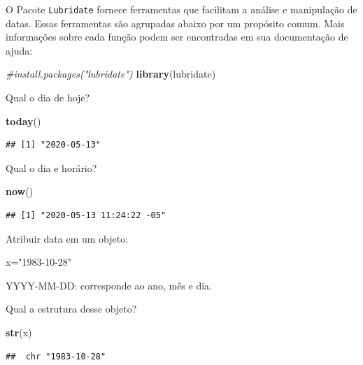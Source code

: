 \documentclass[
]{book}
\newenvironment{Shaded}{\begin{snugshade}}{\end{snugshade}}
\newcommand{\CommentTok}[1]{\textcolor[rgb]{0.56,0.35,0.01}{\textit{#1}}}
\newcommand{\KeywordTok}[1]{\textcolor[rgb]{0.13,0.29,0.53}{\textbf{#1}}}
\newcommand{\NormalTok}[1]{#1}
\newcommand{\StringTok}[1]{\textcolor[rgb]{0.31,0.60,0.02}{#1}}
\begin{document}
O Pacote \texttt{Lubridate} fornece ferramentas que facilitam a análise e manipulação de datas. Essas ferramentas são agrupadas abaixo por um propósito comum. Mais informações sobre cada função podem ser encontradas em sua documentação de ajuda:

\begin{Shaded}
\begin{Highlighting}[]
\CommentTok{#install.packages("lubridate")}
\KeywordTok{library}\NormalTok{(lubridate)}
\end{Highlighting}
\end{Shaded}

Qual o dia de hoje?

\begin{Shaded}
\begin{Highlighting}[]
\KeywordTok{today}\NormalTok{()}
\end{Highlighting}
\end{Shaded}

\begin{verbatim}
## [1] "2020-05-13"
\end{verbatim}

Qual o dia e horário?

\begin{Shaded}
\begin{Highlighting}[]
\KeywordTok{now}\NormalTok{()}
\end{Highlighting}
\end{Shaded}

\begin{verbatim}
## [1] "2020-05-13 11:24:22 -05"
\end{verbatim}

Atribuir data em um objeto:

\begin{Shaded}
\begin{Highlighting}[]
\NormalTok{x=}\StringTok{"1983-10-28"}
\end{Highlighting}
\end{Shaded}

YYYY-MM-DD: corresponde ao ano, mês e dia.

Qual a estrutura desse objeto?

\begin{Shaded}
\begin{Highlighting}[]
\KeywordTok{str}\NormalTok{(x)}
\end{Highlighting}
\end{Shaded}

\begin{verbatim}
##  chr "1983-10-28"
\end{verbatim}
\end{document}
